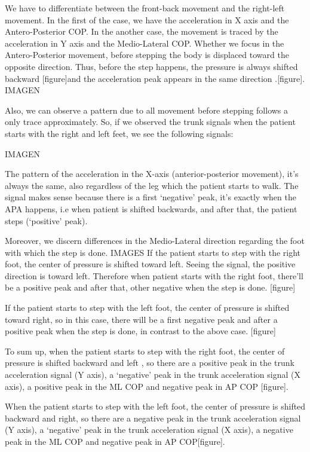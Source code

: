 We have to differentiate between the front-back movement and the right-left movement. In the first of the case, we have the acceleration in X axis and the Antero-Posterior COP. In the another case, the movement is traced by the acceleration in Y axis and the Medio-Lateral  COP.
Whether we focus in the Antero-Posterior movement, before stepping the body is displaced toward the opposite direction. Thus, before the step happens, the pressure is always shifted backward [figure]and the acceleration peak appears in the same direction .[figure].
IMAGEN

Also, we can observe a pattern due to all movement before stepping follows a only trace approximately. So, if we observed the trunk signals when the patient starts with the right and left feet, we see the following signals:

IMAGEN

The pattern of the acceleration in the X-axis (anterior-posterior movement), it’s always the same, also regardless of the leg which the patient starts to walk. The signal makes sense because there is a first ‘negative’ peak, it’s exactly when the APA happens, i.e when patient is shifted backwards, and after that, the patient steps (‘positive’ peak).

Moreover, we discern differences in the Medio-Lateral direction regarding the foot with which the step is done. 
IMAGES
If the patient starts to step with the right foot, the center of pressure is shifted toward left. Seeing the signal, the positive direction is toward left. Therefore when patient starts with the right foot, there’ll be a positive peak and after that, other negative when the step is done. [figure]

If the patient starts to step with the left foot, the center of pressure is shifted toward right, so in this case, there will be a first negative peak and after a positive peak when the step is done, in contrast to the above case. [figure]

To sum up, when the patient starts to step with the right foot, the center of pressure  is shifted backward and left ,  so there are a positive peak in the trunk acceleration signal (Y axis), a ‘negative’ peak in the trunk acceleration signal (X axis), a positive peak in the ML COP and negative peak in AP COP [figure]. 

When the patient starts to step with the left foot, the center of pressure is shifted backward and right, so there are a negative peak in the trunk acceleration signal (Y axis), a ‘negative’ peak in the trunk acceleration signal (X axis), a negative peak in the ML COP and negative peak in AP COP[figure].   
                 
